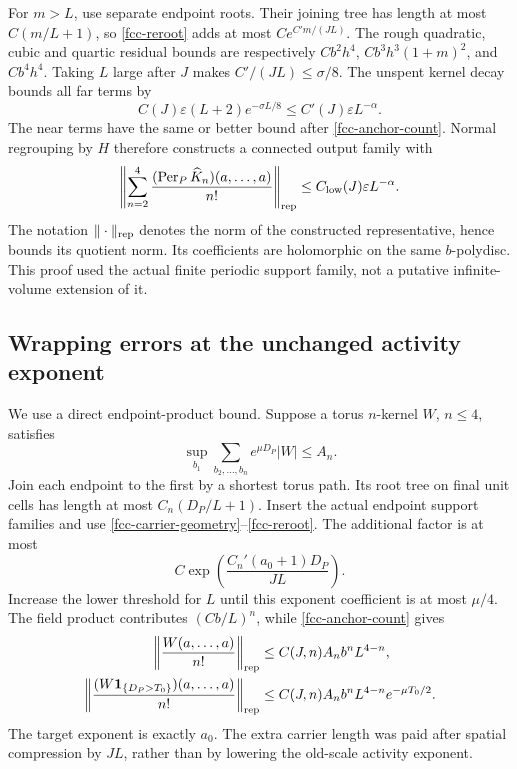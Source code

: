 For \(m>L\), use separate endpoint roots. Their
joining tree has length at most \(C(m/L+1)\), so
\eqref{fcc-reroot} adds at most
\(C e^{C'm/(JL)}\). The rough quadratic, cubic and
quartic residual bounds are respectively
\(Cb^2h^4\), \(Cb^3h^3(1+m)^2\), and \(Cb^4h^4\).
Taking \(L\) large after \(J\) makes \(C'/(JL)\le\sigma/8\).
The unspent kernel decay bounds all far terms by
\[
 C(J)\varepsilon(L+2)e^{-\sigma L/8}
       \le C'(J)\varepsilon L^{-\alpha}.
\]
The near terms have the same or better bound after
\eqref{fcc-anchor-count}. Normal regrouping by \(H\)
therefore constructs a connected output family with
\begin{equation}
 \left\|\sum_{n=2}^4
       \frac{(\operatorname{Per}_P\widehat K_n)
                       (a,\ldots,a)}{n!}\right\|_{\rm rep}
       \le C_{\rm low}(J)\varepsilon L^{-\alpha}.
 \label{fcc-canceled-estimate}
\end{equation}
The notation \(\|\cdot\|_{\rm rep}\) denotes the norm
of the constructed representative, hence bounds its
quotient norm. Its coefficients are holomorphic on
the same \(b\)-polydisc. This proof used the actual
finite periodic support family, not a putative
infinite-volume extension of it.

\subsection{Wrapping errors at the unchanged activity exponent}
\label{fcc-errors-section}

We use a direct endpoint-product bound. Suppose a torus
\(n\)-kernel \(W\), \(n\le4\), satisfies
\begin{equation}
 \sup_{b_1}\sum_{b_2,\ldots,b_n}e^{\mu D_P}|W|
                         \le A_n.
 \label{fcc-error-kernel}
\end{equation}
Join each endpoint to the first by a shortest torus
path. Its root tree on final unit cells has length
at most \(C_n(D_P/L+1)\). Insert the actual endpoint
support families and use
\eqref{fcc-carrier-geometry}--\eqref{fcc-reroot}.
The additional factor is at most
\[
 C\exp\!\left(\frac{C_n'(a_0+1)D_P}{JL}\right).
\]
Increase the lower threshold for \(L\) until this
exponent coefficient is at most \(\mu/4\).
The field product contributes \((Cb/L)^n\), while
\eqref{fcc-anchor-count} gives
\begin{align}
 \left\|\frac{W(a,\ldots,a)}{n!}\right\|_{\rm rep}
   &\le C(J,n)A_n b^n L^{4-n},\notag\\
 \left\|\frac{(W{\bf1}_{\{D_P>T_0\}})(a,\ldots,a)}
                                      {n!}\right\|_{\rm rep}
   &\le C(J,n)A_n b^n L^{4-n}e^{-\mu T_0/2}.
 \label{fcc-tail-localization}
\end{align}
The target exponent is exactly \(a_0\). The extra
carrier length was paid after spatial compression
by \(JL\), rather than by lowering the old-scale
activity exponent.

